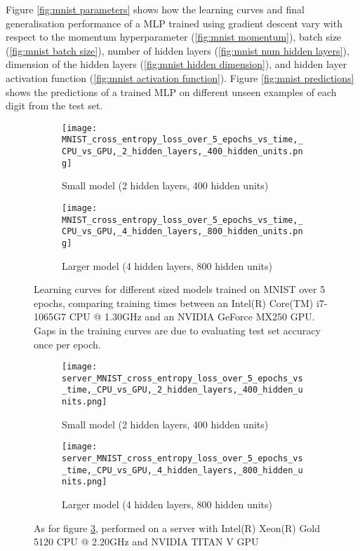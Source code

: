 Figure \ref{fig:mnist parameters} shows how the learning curves and final generalisation performance of a MLP trained using gradient descent vary with respect to the momentum hyperparameter (\ref{fig:mnist momentum}), batch size (\ref{fig:mnist batch size}), number of hidden layers (\ref{fig:mnist num hidden layers}), dimension of the hidden layers (\ref{fig:mnist hidden dimension}), and hidden layer activation function (\ref{fig:mnist activation function}). Figure \ref{fig:mnist predictions} shows the predictions of a trained MLP on different unseen examples of each digit from the test set.
\begin{figure}
    \centering
    \begin{subfigure}{0.45\textwidth}
        \centering
        \texttt{[image: MNIST\_cross\_entropy\_loss\_over\_5\_epochs\_vs\_time,\_CPU\_vs\_GPU,\_2\_hidden\_layers,\_400\_hidden\_units.png]}
        \caption{Small model (2 hidden layers, 400 hidden units)}
        \label{fig:mnist small}
    \end{subfigure}
    \begin{subfigure}{0.45\textwidth}
        \centering
        \texttt{[image: MNIST\_cross\_entropy\_loss\_over\_5\_epochs\_vs\_time,\_CPU\_vs\_GPU,\_4\_hidden\_layers,\_800\_hidden\_units.png]}
        \caption{Larger model (4 hidden layers, 800 hidden units)}
        \label{fig:mnist larger}
    \end{subfigure}
    \caption{Learning curves for different sized models trained on MNIST over 5 epochs, comparing training times between an Intel(R) Core(TM) i7-1065G7 CPU @ 1.30GHz and an NVIDIA GeForce MX250 GPU. Gaps in the training curves are due to evaluating test set accuracy once per epoch.}
    \label{fig:mnist cpu gpu}
\end{figure}
\begin{figure}
    \centering
    \begin{subfigure}{0.45\textwidth}
        \centering
        \texttt{[image: server\_MNIST\_cross\_entropy\_loss\_over\_5\_epochs\_vs\_time,\_CPU\_vs\_GPU,\_2\_hidden\_layers,\_400\_hidden\_units.png]}
        \caption{Small model (2 hidden layers, 400 hidden units)}
        \label{fig:mnist small server}
    \end{subfigure}
    \begin{subfigure}{0.45\textwidth}
        \centering
        \texttt{[image: server\_MNIST\_cross\_entropy\_loss\_over\_5\_epochs\_vs\_time,\_CPU\_vs\_GPU,\_4\_hidden\_layers,\_800\_hidden\_units.png]}
        \caption{Larger model (4 hidden layers, 800 hidden units)}
        \label{fig:mnist larger server}
    \end{subfigure}
    \caption{As for figure \ref{fig:mnist cpu gpu}, performed on a server with Intel(R) Xeon(R) Gold 5120 CPU @ 2.20GHz and NVIDIA TITAN V GPU}
    \label{fig:mnist cpu gpu server}
\end{figure}
